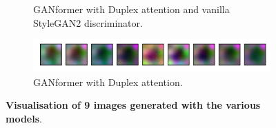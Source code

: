 \documentclass{article}
\begin{document}
\begin{figure}[htpb]
\begin{subfigure}{\linewidth}
			\caption{GANformer with Duplex attention and vanilla StyleGAN2 discriminator.}
		\end{subfigure}
		\begin{subfigure}{\linewidth}
			\includegraphics[width=\linewidth]{../src/trained_network/out_imgs/random_GANFormer_Duplex_D_Att_300kimg.png}
			\vspace{-7mm}
			\caption{GANformer with Duplex attention.}
		\end{subfigure}
		\vspace{3mm}
		\caption{\textbf{Visualisation of 9 images generated with the various models}.}\label{fig:random}
	\end{figure}
\end{document}
